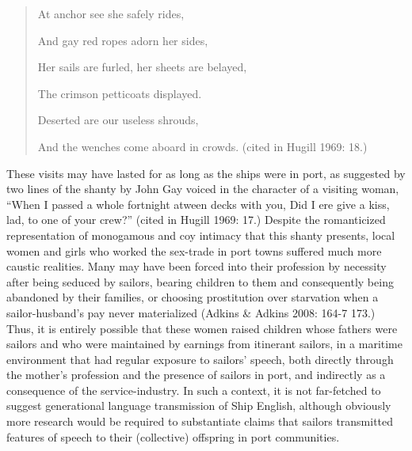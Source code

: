 \documentclass[12pt]{article}
\newenvironment{styleStandard}{\renewcommand\baselinestretch{1.0}\setlength\leftskip{0cm}\setlength\rightskip{0cm plus 1fil}\setlength\parindent{0cm}\setlength\parfillskip{0pt plus 1fil}\setlength\parskip{0in plus 1pt}\writerlistparindent\writerlistleftskip\leavevmode\normalfont\normalsize\writerlistlabel\ignorespaces}{\unskip\vspace{0in plus 1pt}\par}
\newcommand\writerlistleftskip{}
\newcommand\writerlistparindent{}
\newcommand\writerlistlabel{}
\begin{document}
\begin{quotation}
At anchor see she safely rides, 

And gay red ropes adorn her sides, 

Her sails are furled, her sheets are belayed, 

The crimson petticoats displayed. 

Deserted are our useless shrouds, 

And the wenches come aboard in crowds. (cited in Hugill 1969: 18.)

\end{quotation}
\begin{styleStandard}
These visits may have lasted for as long as the ships were in port, as suggested by two lines of the shanty by John Gay voiced in the character of a visiting woman, “When I passed a whole fortnight atween decks with you, Did I ere give a kiss, lad, to one of your crew?” (cited in Hugill 1969: 17.) Despite the romanticized representation of monogamous and coy intimacy that this shanty presents, local women and girls who worked the sex-trade in port towns suffered much more caustic realities. Many may have been forced into their profession by necessity after being seduced by sailors, bearing children to them and consequently being abandoned by their families, or choosing prostitution over starvation when a sailor-husband’s pay never materialized (Adkins \& Adkins 2008: 164-7 173.) Thus, it is entirely possible that these women raised children whose fathers were sailors and who were maintained by earnings from itinerant sailors, in a maritime environment that had regular exposure to sailors’ speech, both directly through the mother’s profession and the presence of sailors in port, and indirectly as a consequence of the service-industry. In such a context, it is not far-fetched to suggest generational language transmission of Ship English, although obviously more research would be required to substantiate claims that sailors transmitted features of speech to their (collective) offspring in port communities. 
\end{styleStandard}
\end{document}
